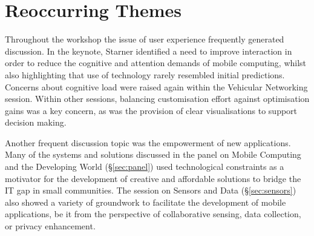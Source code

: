 \section{Reoccurring Themes}
\label{sec:keythemes}

Throughout the workshop the issue of user experience frequently generated 
discussion. In the keynote, %
Starner identified a need 
to improve interaction in order to reduce the cognitive and attention demands of 
mobile computing, whilst also highlighting that use of technology 
rarely resembled initial 
predictions. Concerns about cognitive load were raised again within the Vehicular 
Networking session. %
Within 
other sessions,
balancing customisation effort against optimisation gains was a 
key concern, as was the provision of clear visualisations
to support decision making. %

Another frequent discussion topic was the empowerment of new
applications. Many of the systems and solutions discussed in 
the panel on Mobile Computing and the Developing
World (\S\ref{sec:panel}) used
technological constraints as a motivator for the development of creative and
affordable solutions to bridge the IT gap in small communities. The
session on Sensors and Data (\S\ref{sec:sensors}) also showed a variety
of groundwork to facilitate the development of mobile applications,
be it from the perspective of collaborative sensing, data collection,
or privacy enhancement.

